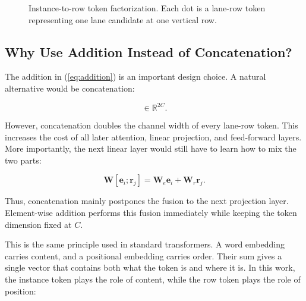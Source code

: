 \documentclass[conference]{IEEEtran}
\begin{document}
\begin{figure}[t]
\centering
{}
\caption{Instance-to-row token factorization. Each dot is a lane-row token representing one lane candidate at one vertical row.}
\label{fig:factorization}
\end{figure}

\subsection{Why Use Addition Instead of Concatenation?}

The addition in (\ref{eq:addition}) is an important design choice. A natural alternative would be concatenation:

\begin{equation}
    [\mathbf{e}_i ; \mathbf{r}_j] \in \mathbb{R}^{2C}.
\end{equation}

However, concatenation doubles the channel width of every lane-row token. This increases the cost of all later attention, linear projection, and feed-forward layers. More importantly, the next linear layer would still have to learn how to mix the two parts:

\begin{equation}
    \mathbf{W}[\mathbf{e}_i ; \mathbf{r}_j]
    =
    \mathbf{W}_{e}\mathbf{e}_i + \mathbf{W}_{r}\mathbf{r}_j.
\end{equation}

Thus, concatenation mainly postpones the fusion to the next projection layer. Element-wise addition performs this fusion immediately while keeping the token dimension fixed at $C$.

This is the same principle used in standard transformers. A word embedding carries content, and a positional embedding carries order. Their sum gives a single vector that contains both what the token is and where it is. In this work, the instance token plays the role of content, while the row token plays the role of position:
\end{document}
